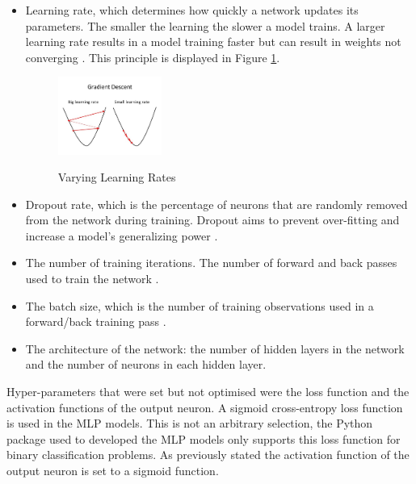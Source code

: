 \begin{itemize}
    \item Learning rate, which determines how quickly a network updates its parameters. The smaller the learning the slower a model trains. A larger learning rate results in a model training faster but can result in weights not converging \parencite{NN_HP}. This principle is displayed in Figure \ref{fig:learning_rates}. 
    
    \vspace{10 pt}

    \begin{figure}[!htb]
    \centering
    \includegraphics[width=0.32\textwidth]{images/learning_rate.jpg}
    \caption{Varying Learning Rates}
    \label{fig:learning_rates}
    \parencite{learning_rate}
    \end{figure}
    
    \vspace{10 pt}
    
    \item Dropout rate, which is the percentage of neurons that are randomly removed from the network during training. Dropout aims to prevent over-fitting and increase a model's generalizing power \parencite{learning_rate}. 
    
    \item The number of training iterations. The number of forward and back passes used to train the network \parencite{NN_HP}.
    
    \item The batch size, which is the number of training observations used in a forward/back training pass \parencite{NN_HP}. 
    
    \item The architecture of the network: the number of hidden layers in the network and the number of neurons in each hidden layer. 

\end{itemize}

 
\vspace{10 pt}

Hyper-parameters that were set but not optimised were the loss function and the activation functions of the output neuron. A sigmoid cross-entropy loss function is used in the MLP models. This is not an arbitrary selection, the Python package used to developed the MLP models only supports this loss function for binary classification problems. As previously stated the activation function of the output neuron is set to a sigmoid function. \\

